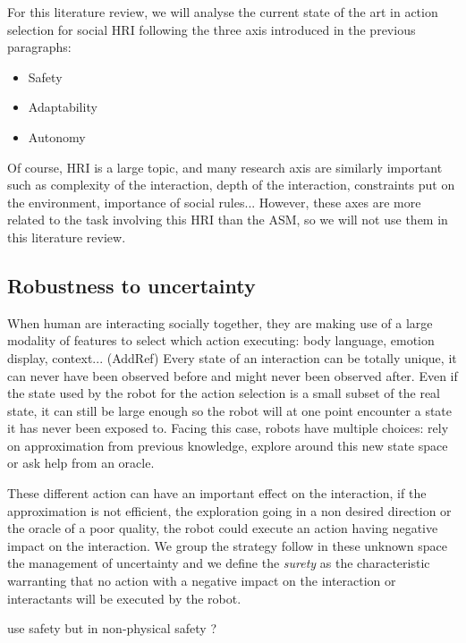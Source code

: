 For this literature review, we will analyse the current state of the art in action selection for social HRI following the three axis introduced in the previous paragraphs:
\begin{itemize}
\item Safety
\item Adaptability
\item Autonomy
\end{itemize}

Of course, HRI is a large topic, and many research axis are similarly important such as complexity of the interaction, depth of the interaction, constraints put on the environment, importance of social rules... However, these axes are more related to the task involving this HRI than the ASM, so we will not use them in this literature review.

	\subsection{Robustness to uncertainty} 
	
When human are interacting socially together, they are making use of a large modality of features to select which action executing: body language, emotion display, context... (AddRef) Every state of an interaction can be totally unique, it can never have been observed before and might never been observed after. Even if the state used by the robot for the action selection is a small subset of the real state, it can still be large enough so the robot will at one point encounter a state it has never been exposed to. Facing this case, robots have multiple choices: rely on approximation from previous knowledge, explore around this new state space or ask help from an oracle. 

These different action can have an important effect on the interaction, if the approximation is not efficient, the exploration going in a non desired direction or the oracle of a poor quality, the robot could execute an action having negative impact on the interaction. We group the strategy follow in these unknown space the management of uncertainty and we define the \emph{surety} as the characteristic warranting that no action with a negative impact on the interaction or interactants will be executed by the robot.
	
	use safety but in non-physical safety ?
	
	

